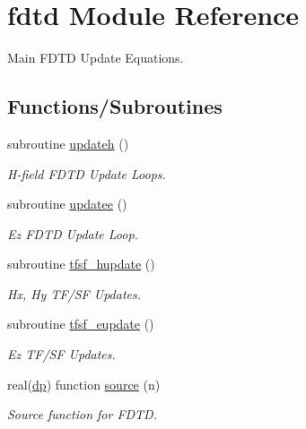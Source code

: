 \hypertarget{namespacefdtd}{}\section{fdtd Module Reference}
\label{namespacefdtd}


Main F\+D\+T\+D Update Equations.  


\subsection*{Functions/\+Subroutines}
\begin{DoxyCompactItemize}
\item 
subroutine \hyperlink{namespacefdtd_a156f4a20b071ad56da4bcc5d270dd747}{updateh} ()
\begin{DoxyCompactList}\small\item\em H-\/field F\+D\+T\+D Update Loops. \end{DoxyCompactList}\item 
subroutine \hyperlink{namespacefdtd_ac0b6814227307ba8b15da323145166ec}{updatee} ()
\begin{DoxyCompactList}\small\item\em Ez F\+D\+T\+D Update Loop. \end{DoxyCompactList}\item 
subroutine \hyperlink{namespacefdtd_a4fe617dcabb91faeed9b43b8c9207d88}{tfsf\+\_\+hupdate} ()
\begin{DoxyCompactList}\small\item\em Hx, Hy T\+F/\+S\+F Updates. \end{DoxyCompactList}\item 
subroutine \hyperlink{namespacefdtd_ac3f5a586d4520cb64eac0709956fdb5b}{tfsf\+\_\+eupdate} ()
\begin{DoxyCompactList}\small\item\em Ez T\+F/\+S\+F Updates. \end{DoxyCompactList}\item 
real(\hyperlink{namespacefdtd_a39bc3cb7950c872f4c987e6f6e1bb68a}{dp}) function \hyperlink{namespacefdtd_aeef08d72062ed5c9275b60deee29e46c}{source} (n)
\begin{DoxyCompactList}\small\item\em Source function for F\+D\+T\+D. \end{DoxyCompactList}\end{DoxyCompactItemize}
